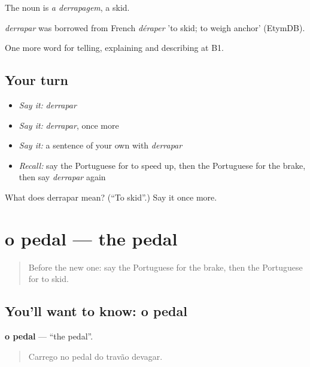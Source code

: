 The noun is \emph{a derrapagem}, a skid.

\begin{cousinweb}
\emph{derrapar} was borrowed from French \emph{déraper} 'to skid; to weigh anchor' (EtymDB).
\end{cousinweb}

\begin{grammarlens}[title={What you've built}]
One more word for telling, explaining and describing at B1.
\end{grammarlens}

\subsection*{Your turn}
\begin{itemize}
\raggedright
  \item \emph{Say it:} \emph{derrapar}
  \item \emph{Say it:} \emph{derrapar}, once more
  \item \emph{Say it:} a sentence of your own with \emph{derrapar}
  \item \emph{Recall:} say the Portuguese for to speed up, then the Portuguese for the brake, then say \emph{derrapar} again
\end{itemize}

\begin{tcolorbox}[breakable,colback=teal!4,colframe=teal!35!black,title={Before you move on}]
What does derrapar mean? (\textquotedblleft{}To skid\textquotedblright{}.) Say it once more.
\end{tcolorbox}
\section[o pedal]{o pedal — the pedal}

\label{lesson:PT-C402-pedal}



\begin{quote}
Before the new one: say the Portuguese for the brake, then the Portuguese for to skid.
\end{quote}

\subsection*{You'll want to know: o pedal}
\textbf{o pedal} — \textquotedblleft{}the pedal\textquotedblright{}.

\begin{quote}
Carrego no pedal do travão devagar.
\end{quote}

